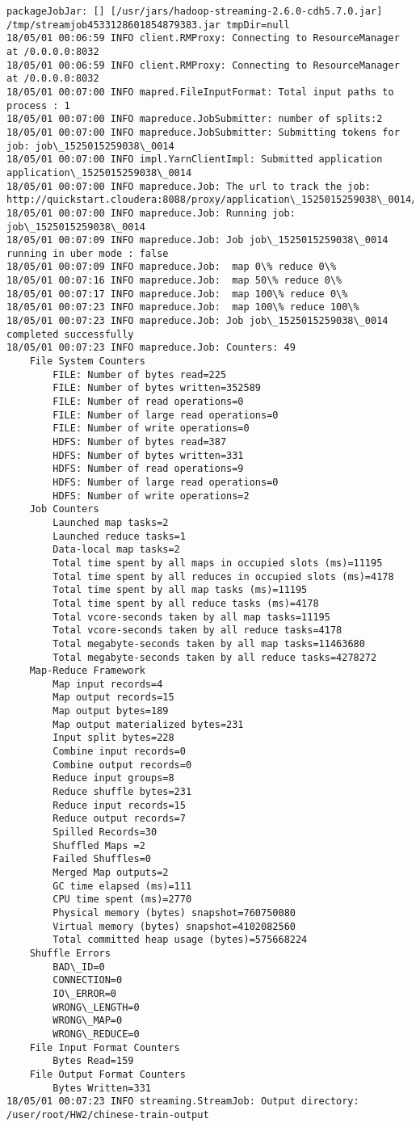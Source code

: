 \documentclass[11pt]{article}
\begin{document}
    \begin{Verbatim}[commandchars=\\\{\}]
packageJobJar: [] [/usr/jars/hadoop-streaming-2.6.0-cdh5.7.0.jar] /tmp/streamjob4533128601854879383.jar tmpDir=null
18/05/01 00:06:59 INFO client.RMProxy: Connecting to ResourceManager at /0.0.0.0:8032
18/05/01 00:06:59 INFO client.RMProxy: Connecting to ResourceManager at /0.0.0.0:8032
18/05/01 00:07:00 INFO mapred.FileInputFormat: Total input paths to process : 1
18/05/01 00:07:00 INFO mapreduce.JobSubmitter: number of splits:2
18/05/01 00:07:00 INFO mapreduce.JobSubmitter: Submitting tokens for job: job\_1525015259038\_0014
18/05/01 00:07:00 INFO impl.YarnClientImpl: Submitted application application\_1525015259038\_0014
18/05/01 00:07:00 INFO mapreduce.Job: The url to track the job: http://quickstart.cloudera:8088/proxy/application\_1525015259038\_0014/
18/05/01 00:07:00 INFO mapreduce.Job: Running job: job\_1525015259038\_0014
18/05/01 00:07:09 INFO mapreduce.Job: Job job\_1525015259038\_0014 running in uber mode : false
18/05/01 00:07:09 INFO mapreduce.Job:  map 0\% reduce 0\%
18/05/01 00:07:16 INFO mapreduce.Job:  map 50\% reduce 0\%
18/05/01 00:07:17 INFO mapreduce.Job:  map 100\% reduce 0\%
18/05/01 00:07:23 INFO mapreduce.Job:  map 100\% reduce 100\%
18/05/01 00:07:23 INFO mapreduce.Job: Job job\_1525015259038\_0014 completed successfully
18/05/01 00:07:23 INFO mapreduce.Job: Counters: 49
	File System Counters
		FILE: Number of bytes read=225
		FILE: Number of bytes written=352589
		FILE: Number of read operations=0
		FILE: Number of large read operations=0
		FILE: Number of write operations=0
		HDFS: Number of bytes read=387
		HDFS: Number of bytes written=331
		HDFS: Number of read operations=9
		HDFS: Number of large read operations=0
		HDFS: Number of write operations=2
	Job Counters 
		Launched map tasks=2
		Launched reduce tasks=1
		Data-local map tasks=2
		Total time spent by all maps in occupied slots (ms)=11195
		Total time spent by all reduces in occupied slots (ms)=4178
		Total time spent by all map tasks (ms)=11195
		Total time spent by all reduce tasks (ms)=4178
		Total vcore-seconds taken by all map tasks=11195
		Total vcore-seconds taken by all reduce tasks=4178
		Total megabyte-seconds taken by all map tasks=11463680
		Total megabyte-seconds taken by all reduce tasks=4278272
	Map-Reduce Framework
		Map input records=4
		Map output records=15
		Map output bytes=189
		Map output materialized bytes=231
		Input split bytes=228
		Combine input records=0
		Combine output records=0
		Reduce input groups=8
		Reduce shuffle bytes=231
		Reduce input records=15
		Reduce output records=7
		Spilled Records=30
		Shuffled Maps =2
		Failed Shuffles=0
		Merged Map outputs=2
		GC time elapsed (ms)=111
		CPU time spent (ms)=2770
		Physical memory (bytes) snapshot=760750080
		Virtual memory (bytes) snapshot=4102082560
		Total committed heap usage (bytes)=575668224
	Shuffle Errors
		BAD\_ID=0
		CONNECTION=0
		IO\_ERROR=0
		WRONG\_LENGTH=0
		WRONG\_MAP=0
		WRONG\_REDUCE=0
	File Input Format Counters 
		Bytes Read=159
	File Output Format Counters 
		Bytes Written=331
18/05/01 00:07:23 INFO streaming.StreamJob: Output directory: /user/root/HW2/chinese-train-output

    \end{Verbatim}
\end{document}

